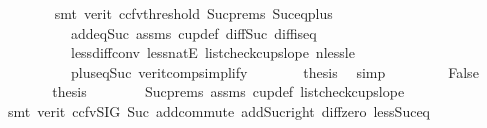 \begin{isabellebody}
\ \ \ \ \ \ \isamarkupfalse%
\ {\isacharparenleft}{\kern0pt}smt\ {\isacharparenleft}{\kern0pt}verit{\isacharcomma}{\kern0pt}\ ccfv{\isacharunderscore}{\kern0pt}threshold{\isacharparenright}{\kern0pt}\ Suc{\isachardot}{\kern0pt}prems\ Suc{\isacharunderscore}{\kern0pt}eq{\isacharunderscore}{\kern0pt}plus{}\isanewline
\ \ \ \ \ \ \ \ \ \ add{\isacharunderscore}{\kern0pt}{}{\isacharunderscore}{\kern0pt}eq{\isacharunderscore}{\kern0pt}Suc{\isacharprime}{\kern0pt}\ assms{\isacharparenleft}{\kern0pt}{}{\isacharparenright}{\kern0pt}\ cup{\isacharunderscore}{\kern0pt}def\ diff{\isacharunderscore}{\kern0pt}Suc{\isacharunderscore}{\kern0pt}{}\ diff{\isacharunderscore}{\kern0pt}is{\isacharunderscore}{\kern0pt}{}{\isacharunderscore}{\kern0pt}eq\isanewline
\ \ \ \ \ \ \ \ \ \ less{\isacharunderscore}{\kern0pt}diff{\isacharunderscore}{\kern0pt}conv\ less{\isacharunderscore}{\kern0pt}natE\ list{\isacharunderscore}{\kern0pt}check{\isacharunderscore}{\kern0pt}cup{}{\isacharunderscore}{\kern0pt}slope\ nless{\isacharunderscore}{\kern0pt}le\isanewline
\ \ \ \ \ \ \ \ \ \ plus{\isacharunderscore}{\kern0pt}{}{\isacharunderscore}{\kern0pt}eq{\isacharunderscore}{\kern0pt}Suc\ verit{\isacharunderscore}{\kern0pt}comp{\isacharunderscore}{\kern0pt}simplify{}{\isacharparenleft}{\kern0pt}{}{\isacharparenright}{\kern0pt}{\isacharparenright}{\kern0pt}\isanewline
\ \ \ \ \isamarkupfalse%
\ \isamarkupfalse%
\ {\isacharquery}{\kern0pt}thesis\ \isamarkupfalse%
\ simp\isanewline
\ \ \isamarkupfalse%
\isanewline
\ \ \ \ \isamarkupfalse%
\ False\isanewline
\ \ \ \ \isamarkupfalse%
\ \isamarkupfalse%
\ {\isacharquery}{\kern0pt}thesis\isanewline
\ \ \ \ \ \ \isamarkupfalse%
\ Suc{\isachardot}{\kern0pt}prems\ assms{\isacharparenleft}{\kern0pt}{}{\isacharparenright}{\kern0pt}\ cup{\isacharunderscore}{\kern0pt}def\ list{\isacharunderscore}{\kern0pt}check{\isacharunderscore}{\kern0pt}cup{}{\isacharunderscore}{\kern0pt}slope\isanewline
\ \ \ \ \ \ \isamarkupfalse%
\ {\isacharparenleft}{\kern0pt}smt\ {\isacharparenleft}{\kern0pt}verit{\isacharcomma}{\kern0pt}\ ccfv{\isacharunderscore}{\kern0pt}SIG{\isacharparenright}{\kern0pt}\ Suc{\isacharunderscore}{\kern0pt}{}\ add{\isachardot}{\kern0pt}commute\ add{\isacharunderscore}{\kern0pt}Suc{\isacharunderscore}{\kern0pt}right\ diff{\isacharunderscore}{\kern0pt}zero\ less{\isacharunderscore}{\kern0pt}Suc{\isacharunderscore}{\kern0pt}eq\ \isanewline

\end{isabellebody}
